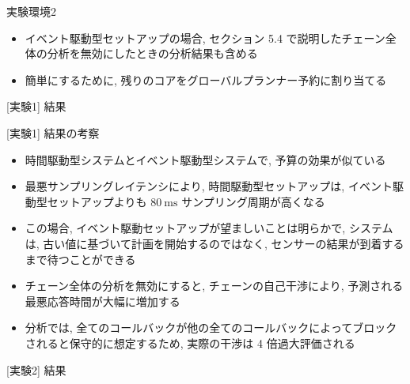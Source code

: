\begin{frame}{実験環境2}
    \begin{itemize}
        \item イベント駆動型セットアップの場合, セクション 5.4 で説明したチェーン全体の分析を無効にしたときの分析結果も含める
        \item 簡単にするために, 残りのコアをグローバルプランナー予約に割り当てる
    \end{itemize}
\end{frame}

\begin{frame}{[実験1] 結果}
\end{frame}

\begin{frame}{[実験1] 結果の考察}
    \begin{itemize}
        \item 時間駆動型システムとイベント駆動型システムで, 予算の効果が似ている
        \item 最悪サンプリングレイテンシにより, 時間駆動型セットアップは, イベント駆動型セットアップよりも $80 \mathrm{~ms}$ サンプリング周期が高くなる
        \item この場合, イベント駆動セットアップが望ましいことは明らかで, システムは, 古い値に基づいて計画を開始するのではなく, センサーの結果が到着するまで待つことができる
        \item チェーン全体の分析を無効にすると, チェーンの自己干渉により, 予測される最悪応答時間が大幅に増加する
        \item 分析では, 全てのコールバックが他の全てのコールバックによってブロックされると保守的に想定するため, 実際の干渉は 4 倍過大評価される
    \end{itemize}
\end{frame}

\begin{frame}{[実験2] 結果}
\end{frame}

